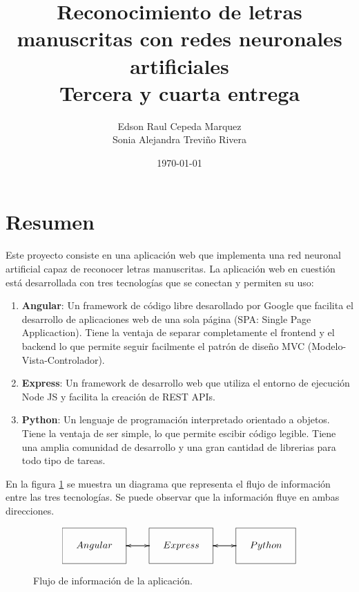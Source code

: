 \documentclass{article}
\title{
    Reconocimiento de letras manuscritas con redes neuronales artificiales\\ 
    \large Tercera y cuarta entrega}
\author{Edson Raul Cepeda Marquez \\ Sonia Alejandra Treviño Rivera}
\date{\today}
\begin{document}
\setlength{\parskip}{2mm}
\setlength{\parindent}{0pt}
\maketitle
\section{Resumen}
Este proyecto consiste en una aplicación web que implementa una red neuronal artificial capaz 
de reconocer letras manuscritas. La aplicación web en cuestión está desarrollada con tres tecnologías 
que se conectan y permiten su uso:
\begin{enumerate}
    \item \textbf{Angular}: Un framework de código libre desarollado por Google que facilita el desarrollo de 
    aplicaciones web de una sola página (SPA: Single Page Applicaction). Tiene la ventaja de separar completamente el frontend y el backend lo que permite
    seguir facilmente el patrón de diseño MVC (Modelo-Vista-Controlador). 
    \item \textbf{Express}: Un framework de desarrollo web que utiliza el entorno de ejecución Node JS y facilita la creación de REST APIs.
    \item \textbf{Python}: Un lenguaje de programación interpretado orientado a objetos. Tiene la ventaja de ser simple, lo que permite escibir código legible.
    Tiene una amplia comunidad de desarrollo y una gran cantidad de librerias para todo tipo de tareas.
\end{enumerate}
En la figura \ref{flujo} se muestra un diagrama que representa el flujo de información entre las tres tecnologías. Se puede observar que la información fluye en ambas direcciones. 
\begin{figure}[H]
    \begin{displaymath}
        \xymatrix{*+<1cm>[F]{Angular} \ar[r] & *+<1cm>[F]{Express} \ar[l] \ar[r] & *+<1cm>[F]{Python} \ar[l]}
    \end{displaymath}
    \caption{Flujo de información de la aplicación.}
    \label{flujo} 
\end{figure}
\end{document}
